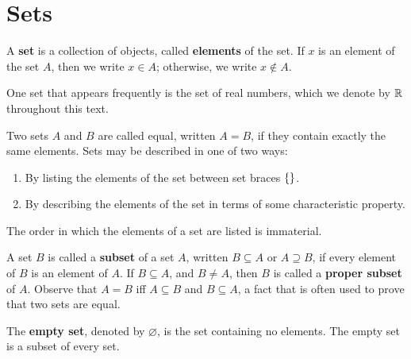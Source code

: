 \chapter{Sets}\label{ch:a}

\begin{defn}\label{a.0.1}
  A \textbf{set} is a collection of objects, called \textbf{elements} of the set.
  If \(x\) is an element of the set \(A\), then we write \(x \in A\);
  otherwise, we write \(x \notin A\).
\end{defn}

\begin{note}
  One set that appears frequently is the set of real numbers, which we denote by \(\mathbb{R}\) throughout this text.
\end{note}

\begin{defn}\label{a.0.2}
  Two sets \(A\) and \(B\) are called equal, written \(A = B\), if they contain exactly the same elements.
  Sets may be described in one of two ways:
  \begin{enumerate}
    \item By listing the elements of the set between set braces \(\left\lbrace\right\rbrace\).
    \item By describing the elements of the set in terms of some characteristic property.
  \end{enumerate}
\end{defn}

\begin{note}
  The order in which the elements of a set are listed is immaterial.
\end{note}

\begin{defn}\label{a.0.3}
  A set \(B\) is called a \textbf{subset} of a set \(A\), written \(B \subseteq A\) or \(A \supseteq B\), if every element of \(B\) is an element of \(A\).
  If \(B \subseteq A\), and \(B \neq A\), then \(B\) is called a \textbf{proper subset} of \(A\).
  Observe that \(A = B\) iff \(A \subseteq B\) and \(B \subseteq A\), a fact that is often used to prove that two sets are equal.
\end{defn}

\begin{defn}\label{a.0.4}
  The \textbf{empty set}, denoted by \(\varnothing\), is the set containing no elements.
  The empty set is a subset of every set.
\end{defn}

